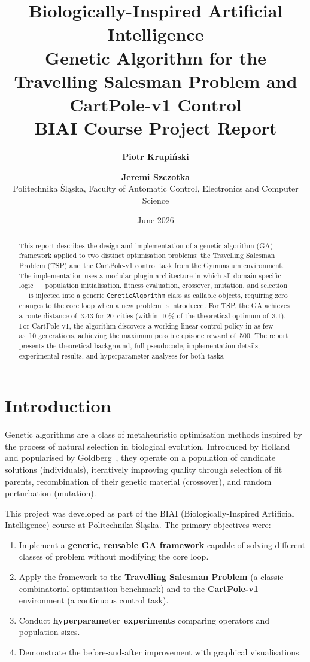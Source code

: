 \documentclass[12pt,a4paper]{article}
\title{
    \vspace{-1cm}
    {\Large Biologically-Inspired Artificial Intelligence}\\[0.4em]
    {\LARGE\bfseries Genetic Algorithm for the Travelling Salesman Problem and CartPole-v1 Control}\\[0.6em]
    {\large BIAI Course Project Report}
}
\author{
    \textbf{Piotr Krupiński} \and \textbf{Jeremi Szczotka}\\[0.3em]
    \small Politechnika Śląska, Faculty of Automatic Control, Electronics and Computer Science
}
\date{\small June 2026}
\begin{document}
\maketitle
\thispagestyle{empty}

\begin{abstract}
This report describes the design and implementation of a genetic algorithm (GA) framework applied to two distinct optimisation problems: the Travelling Salesman Problem (TSP) and the CartPole-v1 control task from the Gymnasium environment. The implementation uses a modular plugin architecture in which all domain-specific logic — population initialisation, fitness evaluation, crossover, mutation, and selection — is injected into a generic \texttt{GeneticAlgorithm} class as callable objects, requiring zero changes to the core loop when a new problem is introduced. For TSP, the GA achieves a route distance of~3.43 for 20~cities (within~10\% of the theoretical optimum of~3.1). For CartPole-v1, the algorithm discovers a working linear control policy in as few as~10 generations, achieving the maximum possible episode reward of~500. The report presents the theoretical background, full pseudocode, implementation details, experimental results, and hyperparameter analyses for both tasks.
\end{abstract}

\tableofcontents
\newpage

\section{Introduction}
\label{sec:intro}

Genetic algorithms are a class of metaheuristic optimisation methods inspired by the process of natural selection in biological evolution. Introduced by Holland~\cite{holland1975} and popularised by Goldberg~\cite{goldberg1989}, they operate on a population of candidate solutions (individuals), iteratively improving quality through selection of fit parents, recombination of their genetic material (crossover), and random perturbation (mutation).

This project was developed as part of the BIAI (Biologically-Inspired Artificial Intelligence) course at Politechnika Śląska. The primary objectives were:

\begin{enumerate}
    \item Implement a \textbf{generic, reusable GA framework} capable of solving different classes of problem without modifying the core loop.
    \item Apply the framework to the \textbf{Travelling Salesman Problem} (a classic combinatorial optimisation benchmark) and to the \textbf{CartPole-v1} environment (a continuous control task).
    \item Conduct \textbf{hyperparameter experiments} comparing operators and population sizes.
    \item Demonstrate the before-and-after improvement with graphical visualisations.
\end{enumerate}
\end{document}
